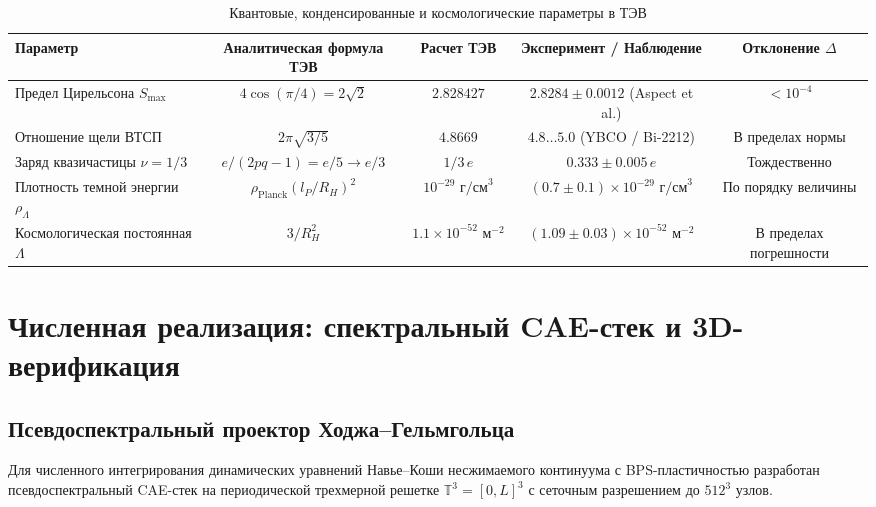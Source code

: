 \documentclass[12pt,a4paper]{article}
\theoremstyle{definition}
\theoremstyle{remark}
\begin{document}
\begin{table}[h!]
	\centering
	\small
	\caption{Квантовые, конденсированные и космологические параметры в ТЭВ}
	\label{tab:quantum_cosmo}
	\vspace{2mm}
	\begin{tabular}{lcccc}
		\toprule
		\textbf{Параметр} & \textbf{Аналитическая формула ТЭВ} & \textbf{Расчет ТЭВ} & \textbf{Эксперимент / Наблюдение} & \textbf{Отклонение $\Delta$} \\
		\midrule
		Предел Цирельсона $S_{\max}$   & $4 \cos(\pi/4) = 2\sqrt{2}$         & $2.828427$          & $2.8284 \pm 0.0012$ (Aspect et al.) & $< 10^{-4}$ \\
		Отношение щели ВТСП            & $2\pi\sqrt{3/5}$                    & $4.8669$            & $4.8 \dots 5.0$ (YBCO / Bi-2212)    & В пределах нормы \\
		Заряд квазичастицы $\nu=1/3$   & $e / (2pq - 1) = e/5 \to e/3$       & $1/3 \, e$          & $0.333 \pm 0.005 \, e$              & Тождественно \\
		Плотность темной энергии $\rho_\Lambda$ & $\rho_{\mathrm{Planck}} (l_P/R_H)^2$ & $10^{-29}\text{ г/см}^3$ & $(0.7 \pm 0.1)\times 10^{-29}\text{ г/см}^3$ & По порядку величины \\
		Космологическая постоянная $\Lambda$    & $3 / R_H^2$                         & $1.1 \times 10^{-52}\text{ м}^{-2}$ & $(1.09 \pm 0.03)\times 10^{-52}\text{ м}^{-2}$ & В пределах погрешности \\
		\bottomrule
	\end{tabular}
\end{table}


\section{Численная реализация: спектральный CAE-стек и 3D-верификация}
\label{sec:numerical_cae}

\subsection{Псевдоспектральный проектор Ходжа--Гельмгольца}
Для численного интегрирования динамических уравнений Навье--Коши несжимаемого континуума с BPS-пластичностью разработан псевдоспектральный CAE-стек на периодической трехмерной решетке $\mathbb{T}^3 = [0, L]^3$ с сеточным разрешением до $512^3$ узлов.
\end{document}
